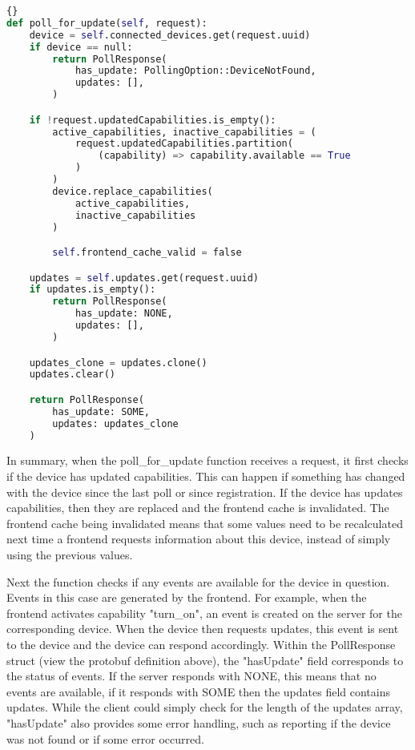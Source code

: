 \begin{lstlisting}[language=Python, style=boxed, showstringspaces=false]{}
def poll_for_update(self, request):
    device = self.connected_devices.get(request.uuid)
    if device == null:
        return PollResponse(
            has_update: PollingOption::DeviceNotFound,
            updates: [],
        )

    if !request.updatedCapabilities.is_empty():
        active_capabilities, inactive_capabilities = (
            request.updatedCapabilities.partition(
                (capability) => capability.available == True
            )
        )
        device.replace_capabilities(
            active_capabilities,
            inactive_capabilities
        )

        self.frontend_cache_valid = false

    updates = self.updates.get(request.uuid)
    if updates.is_empty():
        return PollResponse(
            has_update: NONE,
            updates: [],
        )

    updates_clone = updates.clone()
    updates.clear()

    return PollResponse(
        has_update: SOME,
        updates: updates_clone
    )
\end{lstlisting}
In summary, when the poll\_for\_update function receives a request, it first checks if the device has updated capabilities. This can happen if something has changed with the device since the last poll or since registration. If the device has updates capabilities, then they are replaced and the frontend cache is invalidated. The frontend cache being invalidated means that some values need to be recalculated next time a frontend requests information about this device, instead of simply using the previous values.

Next the function checks if any events are available for the device in question. Events in this case are generated by the frontend. For example, when the frontend activates capability "turn\_on", an event is created on the server for the corresponding device. When the device then requests updates, this event is sent to the device and the device can respond accordingly. Within the PollResponse struct (view the protobuf definition above), the "hasUpdate" field corresponds to the status of events. If the server responds with NONE, this means that no events are available, if it responds with SOME then the updates field contains updates. While the client could simply check for the length of the updates array, "hasUpdate" also provides some error handling, such as reporting if the device was not found or if some error occurred.

